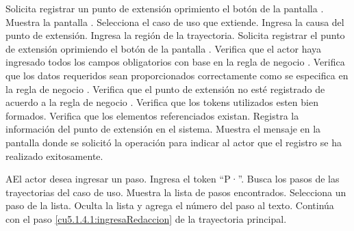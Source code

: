 
 \begin{UCtrayectoria}
	\UCpaso[\UCactor] Solicita registrar un punto de extensión oprimiento el botón  de la pantalla . 
	\UCpaso[\UCsist] Muestra la pantalla . 
	\UCpaso[\UCactor] Selecciona el caso de uso que extiende. \label{cu5.1.4.1:ingresaDatos}
	\UCpaso[\UCactor] Ingresa la causa del punto de extensión.
	\UCpaso[\UCactor] Ingresa la región de la trayectoria. \label{cu5.1.4.1:ingresaRedaccion} 
	\UCpaso[\UCactor] Solicita registrar el punto de extensión oprimiendo el botón  de la pantalla .  
	\UCpaso[\UCsist] Verifica que el actor haya ingresado todos los campos obligatorios con base en la regla de negocio . 
	\UCpaso[\UCsist] Verifica que los datos requeridos sean proporcionados correctamente como se especifica en la regla de negocio .  
	\UCpaso[\UCsist] Verifica que el punto de extensión no esté registrado de acuerdo a la regla de negocio . 
	\UCpaso[\UCsist] Verifica que los tokens utilizados esten bien formados. 
	\UCpaso[\UCsist] Verifica que los elementos referenciados existan. 
	\UCpaso[\UCsist] Registra la información del punto de extensión en el sistema.
	\UCpaso[\UCsist] Muestra el mensaje  en la pantalla donde se solicitó la operación
	para indicar al actor que el registro se ha realizado exitosamente. 
\end{UCtrayectoria}

 \begin{UCtrayectoriaA}{A}{El actor desea ingresar un paso.}
 	\UCpaso[\UCactor] Ingresa el token ``P·''.
  	\UCpaso[\UCsist] Busca los pasos de las trayectorias del caso de uso.
  	\UCpaso[\UCsist] Muestra la lista de pasos encontrados.
 	\UCpaso[\UCactor] Selecciona un paso de la lista.
  	\UCpaso[\UCsist] Oculta la lista y agrega el número del paso al texto.
    \UCpaso[] Continúa con el paso \ref{cu5.1.4.1:ingresaRedaccion} de la trayectoria principal.
 \end{UCtrayectoriaA}

